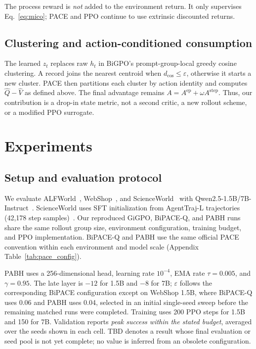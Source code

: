 \documentclass[10pt,twocolumn,letterpaper]{article}
\newcommand{\method}{PABH\xspace}
\newcommand{\TBD}{\textcolor{red!60!black}{TBD}}
\newcommand{\Aepisode}{A^{\mathrm{ep}}}
\newcommand{\Astep}{A^{\mathrm{step}}}
\begin{document}
The process reward is \emph{not} added to the environment return. It only supervises Eq.~\ref{eq:mico}; PACE and PPO continue to use extrinsic discounted returns.

\subsection{Clustering and action-conditioned consumption}
The learned $z_t$ replaces raw $h_t$ in BiGPO's prompt-group-local greedy cosine clustering. A record joins the nearest centroid when $d_{\cos}\leq\varepsilon$, otherwise it starts a new cluster. PACE then partitions each cluster by action identity and computes $\hat Q-\hat V$ as defined above. The final advantage remains $A=\Aepisode+\omega\Astep$. Thus, our contribution is a drop-in state metric, not a second critic, a new rollout scheme, or a modified PPO surrogate.

\section{Experiments}
\label{sec:exp}

\subsection{Setup and evaluation protocol}
We evaluate ALFWorld~\cite{alfworld}, WebShop~\cite{webshop}, and ScienceWorld~\cite{scienceworld} with Qwen2.5-1.5B/7B-Instruct~\cite{qwen}. ScienceWorld uses SFT initialization from AgentTraj-L trajectories (42,178 step samples)~\cite{agentgym}. Our reproduced GiGPO, BiPACE-Q, and \method runs share the same rollout group size, environment configuration, training budget, and PPO implementation. BiPACE-Q and \method use the same official PACE convention within each environment and model scale (Appendix Table~\ref{tab:pace_config}).

\method uses a 256-dimensional head, learning rate $10^{-4}$, EMA rate $\tau=0.005$, and $\gamma=0.95$. The late layer is $-12$ for 1.5B and $-8$ for 7B; $\varepsilon$ follows the corresponding BiPACE configuration except on WebShop 1.5B, where BiPACE-Q uses 0.06 and \method uses 0.04, selected in an initial single-seed sweep before the remaining matched runs were completed. Training uses 200 PPO steps for 1.5B and 150 for 7B. Validation reports \emph{peak success within the stated budget}, averaged over the seeds shown in each cell. \TBD{} denotes a result whose final evaluation or seed pool is not yet complete; no value is inferred from an obsolete configuration.
\end{document}
